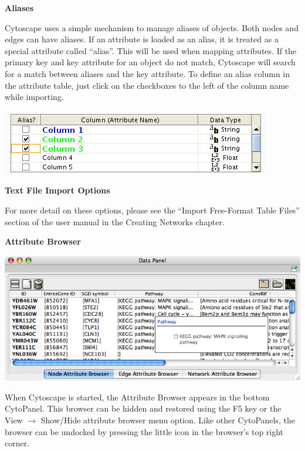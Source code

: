  
\textbf{Aliases}


 Cytoscape uses a simple mechanism to manage aliases of objects. Both nodes and
edges can have aliases. If an attribute is loaded as an alias, it is treated as
a special attribute called ``alias''. This will be used when mapping
attributes. If the primary key and key attribute for an object do not match,
Cytoscape will search for a match between aliases and the key attribute. To
define an alias column in the attribute table, just click on the checkboxes to
the left of the column name while importing. 


 \includegraphics[width=\textwidth]{images/attribute_table_import_alias.png} 


 
\textbf{Text File Import Options}


 For more detail on these options, please see the ``Import Free-Format Table
Files'' section of the user manual in the Creating Networks chapter. 


 

\textbf{Attribute Browser}


 \includegraphics[width=\textwidth]{images/attribute_browser26.png} 


 When Cytoscape is started, the Attribute Browser appears in the bottom
CytoPanel. This browser can be hidden and restored using the F5 key or the View
$\rightarrow$ Show/Hide attribute browser menu option. Like other CytoPanels, the
browser can be undocked by pressing the little icon in the browser's
top right corner. 


